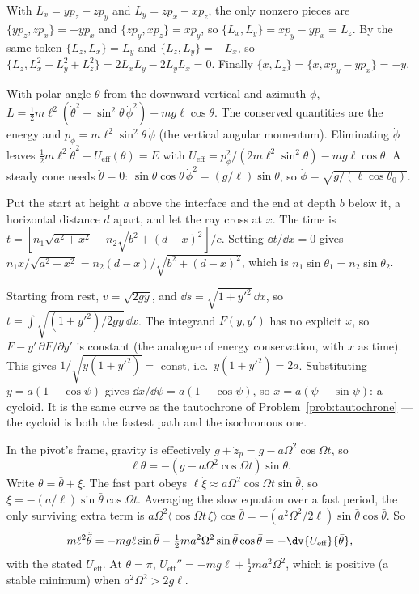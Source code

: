  With $L_x = yp_z - zp_y$ and $L_y = zp_x - xp_z$, the only nonzero pieces are $\{yp_z, zp_x\} = -yp_x$ and $\{zp_y, xp_z\} = xp_y$, so $\{L_x, L_y\} = xp_y - yp_x = L_z$. By the same token $\{L_z,L_x\} = L_y$ and $\{L_z,L_y\} = -L_x$, so $\{L_z, L_x^2+L_y^2+L_z^2\} = 2L_xL_y - 2L_yL_x = 0$. Finally $\{x, L_z\} = \{x, xp_y - yp_x\} = -y$.

 With polar angle $\theta$ from the downward vertical and azimuth $\phi$, $L = \tfrac12m\ell^2(\dot\theta^2 + \sin^2\theta\,\dot\phi^2) + mg\ell\cos\theta$. The conserved quantities are the energy and $p_\phi = m\ell^2\sin^2\theta\,\dot\phi$ (the vertical angular momentum). Eliminating $\dot\phi$ leaves $\tfrac12m\ell^2\dot\theta^2 + U_{\text{eff}}(\theta) = E$ with $U_{\text{eff}} = p_\phi^2/(2m\ell^2\sin^2\theta) - mg\ell\cos\theta$. A steady cone needs $\ddot\theta = 0$: $\sin\theta\cos\theta\,\dot\phi^2 = (g/\ell)\sin\theta$, so $\dot\phi = \sqrt{g/(\ell\cos\theta_0)}$.

 Put the start at height $a$ above the interface and the end at depth $b$ below it, a horizontal distance $d$ apart, and let the ray cross at $x$. The time is $t = [n_1\sqrt{a^2+x^2} + n_2\sqrt{b^2+(d-x)^2}]/c$. Setting $\dd t/\dd x = 0$ gives $n_1x/\sqrt{a^2+x^2} = n_2(d-x)/\sqrt{b^2+(d-x)^2}$, which is $n_1\sin\theta_1 = n_2\sin\theta_2$.

 Starting from rest, $v = \sqrt{2gy}$, and $\dd s = \sqrt{1+y'^2}\,\dd x$, so $t = \int\sqrt{(1+y'^2)/2gy}\,\dd x$. The integrand $F(y,y')$ has no explicit $x$, so $F - y'\,\partial F/\partial y'$ is constant (the analogue of energy conservation, with $x$ as time). This gives $1/\sqrt{y(1+y'^2)} = $ const, i.e.\ $y(1+y'^2) = 2a$. Substituting $y = a(1-\cos\psi)$ gives $\dd x/\dd\psi = a(1-\cos\psi)$, so $x = a(\psi - \sin\psi)$: a cycloid. It is the same curve as the tautochrone of Problem~\ref{prob:tautochrone} --- the cycloid is both the fastest path and the isochronous one.

 In the pivot's frame, gravity is effectively $g + \ddot z_p = g - a\Omega^2\cos\Omega t$, so
\[
  \ell\ddot\theta = -(g - a\Omega^2\cos\Omega t)\sin\theta .
\]
Write $\theta = \bar\theta + \xi$. The fast part obeys $\ell\ddot\xi\approx a\Omega^2\cos\Omega t\sin\bar\theta$, so $\xi = -(a/\ell)\sin\bar\theta\cos\Omega t$. Averaging the slow equation over a fast period, the only surviving extra term is $a\Omega^2\langle\cos\Omega t\,\xi\rangle\cos\bar\theta = -(a^2\Omega^2/2\ell)\sin\bar\theta\cos\bar\theta$. So
\[
  m\ell^2\ddot{\bar\theta} = -mg\ell\sin\bar\theta - \tfrac12ma^2\Omega^2\sin\bar\theta\cos\bar\theta = -\dv{U_{\text{eff}}}{\bar\theta},
\]
with the stated $U_{\text{eff}}$. At $\theta = \pi$, $U_{\text{eff}}'' = -mg\ell + \tfrac12ma^2\Omega^2$, which is positive (a stable minimum) when $a^2\Omega^2>2g\ell$.

